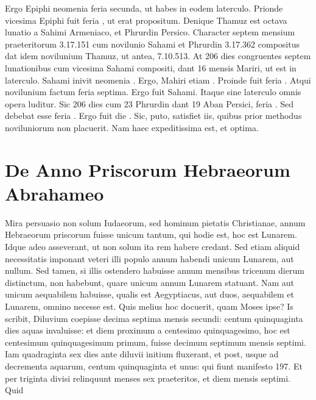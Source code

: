 Ergo Epiphi neomenia
feria secunda, ut habes in eodem laterculo. %
Prionde vicesima Epiphi
fuit feria , ut erat propositum.
Denique Thamuz est octava lunatio
a Sahimi Armeniaco, et Phrurdin Persico.
Character septem mensium
praeteritorum 3.17.151 cum novilunio Sahami et Phrurdin 3.17.362
compositus dat idem novilunium Thamuz, ut antea, 7.10.513.
At 206 dies congruentes septem lunationibus cum vicesima Sahami
compositi, dant 16 mensis Mariri, ut est in laterculo.
Sahami inivit
neomenia .
Ergo, Mahiri etiam .
Proinde  fuit feria .
Atqui novilunium factum feria septima.
Ergo fuit  Sahami.
Itaque
sine laterculo omnis opera luditur.
Sic 206 dies cum 23 Phrurdin
dant 19 Aban Persici, feria .
Sed debebat esse feria .
Ergo fuit
die .
Sic, puto, satisfiet iis, quibus prior methodus noviluniorum
non placuerit.
Nam haec expeditissima est, et optima.
%
\section{De Anno Priscorum Hebraeorum Abrahameo}
Mira persuasio non solum Iudaeorum, sed hominum pietatis
Christianae, annum Hebraeorum priscorum fuisse unicum tantum,
qui hodie est, hoc est Lunarem.
Idque adeo asseverant, ut
non solum ita rem habere credant.
Sed etiam aliquid necessitatis imponant
veteri illi populo annum habendi unicum Lunarem, aut nullum.
Sed tamen, si illis ostendero habuisse annum mensibus tricenum
dierum distinctum, non habebunt, quare unicum annum Lunarem
statuant.
Nam aut unicum aequabilem habuisse, qualis est Aegyptiacus,
aut duos, aequabilem et Lunarem, omnino necesse est.
Quis
melius hoc docuerit, quam Moses ipse?
Is scribit, Diluvium coepisse
decima septima mensis secundi: centum quinquaginta dies aquas
invaluisse: et diem proximum a centesimo quinquagesimo,
hoc est centesimum quinquagesimum primum, fuisse decimum
septimum mensis septimi.
%
Iam quadraginta sex dies ante diluvii initium
fluxerant, et post, usque ad decrementa aquarum, centum
quinquaginta et unus: qui fiunt manifesto 197.
Et per triginta divisi
relinquunt menses sex praeteritos, et diem  mensis septimi.
Quid



























